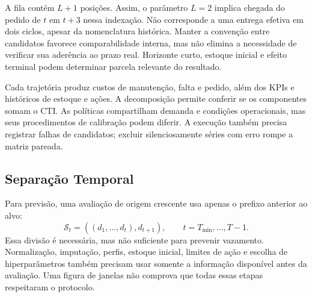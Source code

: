A fila contém $L+1$ posições. Assim, o parâmetro $L=2$ implica chegada do pedido de $t$ em $t+3$ nessa indexação. Não corresponde a uma entrega efetiva em dois ciclos, apesar da nomenclatura histórica. Manter a convenção entre candidatos favorece comparabilidade interna, mas não elimina a necessidade de verificar sua aderência ao prazo real. Horizonte curto, estoque inicial e efeito terminal podem determinar parcela relevante do resultado.

Cada trajetória produz custos de manutenção, falta e pedido, além dos KPIs e históricos de estoque e ações. A decomposição permite conferir se os componentes somam o CTI. As políticas compartilham demanda e condições operacionais, mas seus procedimentos de calibração podem diferir. A execução também precisa registrar falhas de candidatos; excluir silenciosamente séries com erro rompe a matriz pareada.

\subsection{Separação Temporal}
\label{sec:wf_protocol}

Para previsão, uma avaliação de origem crescente usa apenas o prefixo anterior ao alvo:
\begin{equation}
\mathcal S_t=((d_1,\ldots,d_t),d_{t+1}),\qquad t=T_{\min},\ldots,T-1.
\label{eq:wf_splits}
\end{equation}
Essa divisão é necessária, mas não suficiente para prevenir vazamento. Normalização, imputação, perfis, estoque inicial, limites de ação e escolha de hiperparâmetros também precisam usar somente a informação disponível antes da avaliação. Uma figura de janelas não comprova que todas essas etapas respeitaram o protocolo.

